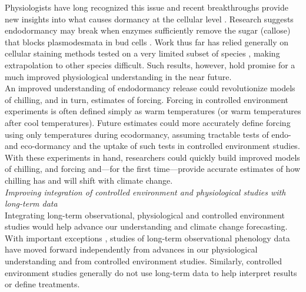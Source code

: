 \documentclass[11pt,letter]{article}
\begin{document}
Physiologists have long recognized this issue and recent breakthroughs provide new insights into what causes dormancy at the cellular level \citep{vanderschoot2014}. Research suggests endodormancy may break when enzymes sufficiently remove the sugar (callose) that blocks plasmodesmata in bud cells \citep[reviewed in][]{chang2021}. Work thus far has relied generally on cellular staining methods tested on a very limited subset of species \citep{rinne2011,singh2019}, making extrapolation to other species difficult. Such results, however, hold promise for a much improved physiological understanding in the near future.\\

An improved understanding of endodormancy release could revolutionize models of chilling, and in turn, estimates of forcing. Forcing in controlled environment experiments is often defined simply as warm temperatures (or warm temperatures after cool temperatures). Future estimates could more accurately define forcing using only temperatures during ecodormancy, assuming tractable tests of endo- and eco-dormancy and the uptake of such tests in controlled environment studies. With these experiments in hand, researchers could quickly build improved models of chilling, and forcing and---for the first time---provide accurate estimates of how chilling has and will shift with climate change.\\ 

\emph{Improving integration of controlled environment and physiological studies with long-term data}\\
Integrating long-term observational, physiological and controlled environment studies would help advance our understanding and climate change forecasting. With important exceptions \citep[e.g.,][]{gauzere2017}, studies of long-term observational phenology data have moved forward independently from advances in our physiological understanding and from controlled environment studies. Similarly, controlled environment studies generally do not use long-term data to help interpret results or define treatments. \\
\end{document}
